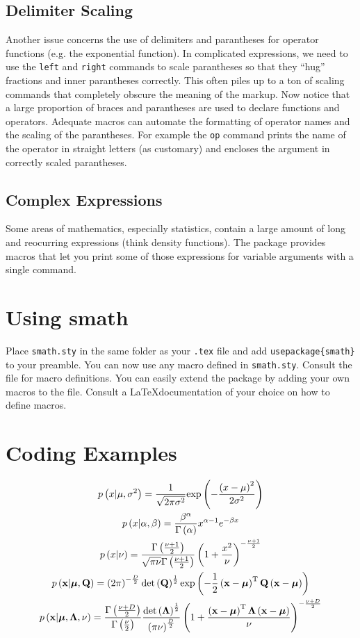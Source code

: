 \documentclass[a4paper,10pt]{scrartcl}
\begin{document}
\subsection{Delimiter Scaling}
Another issue concerns the use of delimiters and parantheses for operator functions (e.g. the exponential function). In complicated expressions, we need to use the \texttt{left} and \texttt{right} commands to scale parantheses so that they ``hug'' fractions and inner parantheses correctly. This often piles up to a ton of scaling commands that completely obscure the meaning of the markup. Now notice that a large proportion of braces and parantheses are used to declare functions and operators. Adequate macros can automate the formatting of operator names and the scaling of the parantheses. For example the \texttt{op} command prints the name of the operator in straight letters (as customary) and encloses the argument in correctly scaled parantheses.
\subsection{Complex Expressions}
Some areas of mathematics, especially statistics, contain a large amount of long and reocurring expressions (think density functions). The package provides macros that let you print some of those expressions for variable arguments with a single command.

\section{Using smath}
Place \texttt{smath.sty} in the same folder as your \texttt{.tex} file and add \texttt{usepackage\{smath\}} to your preamble. You can now use any macro defined in \texttt{smath.sty}. Consult the file for macro definitions. You can easily extend the package by adding your own macros to the file. Consult a \LaTeX documentation of your choice on how to define macros.

\section{Coding Examples}
\begin{gather*}
  \fun{p}{x | \mu, \sigma^2} = \dgauss{x}{\mu}{\sigma^2} \\
  \fun{p}{x | \alpha, \beta} = \dgamma{x}{\alpha}{\beta} \\
  \fun{p}{x | \nu} = \dt{x}{\nu} \\
  \fun{p}{\nvec{x} | \nvec{\mu}, \mat{Q}} = \dmgauss{\nvec{x}}{\nvec{\mu}}{\mat{Q}}{D} \\
  \fun{p}{\nvec{x} | \nvec{\mu}, \mat{\Lambda}, \nu} = \dmt{\nvec{x}}{\nvec{\mu}}{\mat{\Lambda}}{\nu}{D} \\
\end{gather*}
\end{document}
